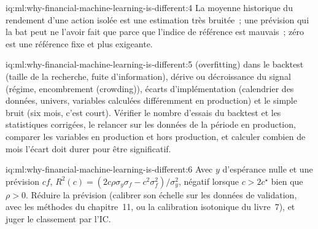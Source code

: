 \begin{solution}{iq:ml:why-financial-machine-learning-is-different:4}
La moyenne historique du rendement d'une action isolée est une estimation très bruitée~; une prévision qui la bat peut ne l'avoir
fait que parce que l'indice de référence est mauvais~; zéro est une référence fixe et plus exigeante.
\end{solution}

\begin{solution}{iq:ml:why-financial-machine-learning-is-different:5}
 (overfitting) dans le backtest (taille de la recherche, fuite d'information), dérive ou décroissance du signal (régime, encombrement (crowding)), écarts d'implémentation
(calendrier des données, univers, variables calculées différemment en production) et le simple bruit (six mois, c'est court). Vérifier
le nombre d'essais du backtest et les statistiques corrigées, le relancer sur les données de la période en production, comparer les variables en production et
hors production, et calculer combien de mois l'écart doit durer pour être significatif.
\end{solution}

\begin{solution}{iq:ml:why-financial-machine-learning-is-different:6}
Avec $y$ d'espérance nulle et une prévision $cf$, $R^2(c) = (2c\rho\sigma_y\sigma_f - c^2\sigma_f^2)/\sigma_y^2$, négatif lorsque $c > 2c^\star$
bien que $\rho > 0$. Réduire la prévision (calibrer son échelle sur les données de validation, avec les méthodes du chapitre~11, ou la
calibration isotonique du livre~7), et juger le classement par l'IC.
\end{solution}
